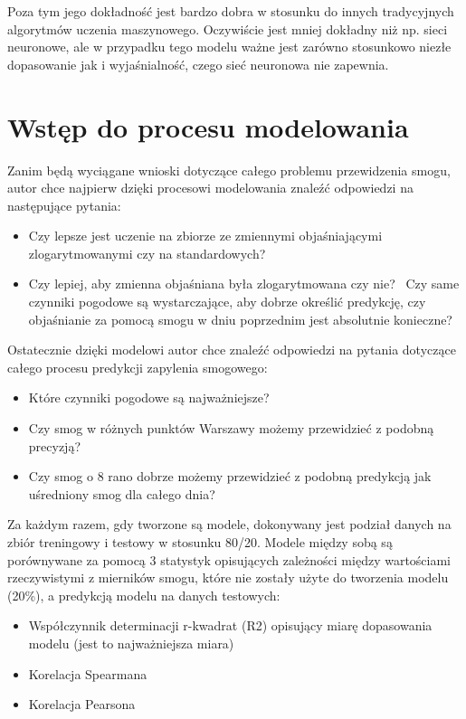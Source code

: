 \documentclass[a4paper,12pt,twoside,openany]{report}
\begin{document}
Poza tym jego dokładność jest bardzo dobra w stosunku do innych tradycyjnych algorytmów uczenia maszynowego. Oczywiście jest mniej dokładny niż np. sieci neuronowe, ale w przypadku tego modelu ważne jest zarówno stosunkowo niezłe dopasowanie jak i wyjaśnialność, czego sieć neuronowa nie zapewnia.

\section{Wstęp do procesu modelowania}

Zanim będą wyciągane wnioski dotyczące całego problemu przewidzenia smogu, autor chce najpierw dzięki procesowi modelowania znaleźć odpowiedzi na następujące pytania:

\begin{itemize}
	\item Czy lepsze jest uczenie na zbiorze ze zmiennymi objaśniającymi zlogarytmowanymi czy na standardowych?
	\item Czy lepiej, aby zmienna objaśniana była zlogarytmowana czy nie?
	\ Czy same czynniki pogodowe są wystarczające, aby dobrze określić predykcję, czy objaśnianie za pomocą smogu w dniu poprzednim jest absolutnie konieczne?
\end{itemize}

Ostatecznie dzięki modelowi autor chce znaleźć odpowiedzi na pytania dotyczące całego procesu predykcji zapylenia smogowego:

\begin{itemize}
	\item Które czynniki pogodowe są najważniejsze?
	\item Czy smog w różnych punktów Warszawy możemy przewidzieć z podobną precyzją?
	\item Czy smog o 8 rano dobrze możemy przewidzieć z podobną predykcją jak uśredniony smog dla całego dnia?
\end{itemize}

Za każdym razem, gdy tworzone są modele, dokonywany jest podział danych na zbiór treningowy i testowy w stosunku 80/20. Modele między sobą są porównywane za pomocą 3 statystyk opisujących zależności między wartościami rzeczywistymi z mierników smogu, które nie zostały użyte do tworzenia modelu (20\%), a predykcją modelu na danych testowych: 

\begin{itemize}
	\item Współczynnik determinacji r-kwadrat (R2) opisujący miarę dopasowania modelu (jest to najważniejsza miara)
	\item Korelacja Spearmana
	\item Korelacja Pearsona
\end{itemize}
\end{document}
